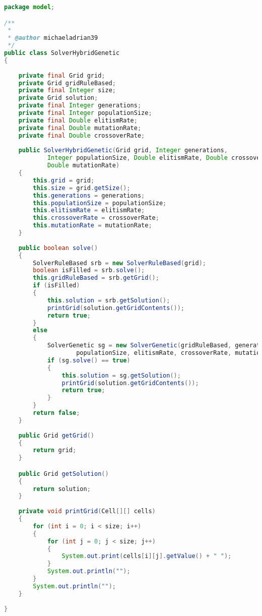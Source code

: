 \begin{lstlisting}[language=Java,basicstyle=\tiny,caption=SolverHybridGenetic.java]
package model;

/**
 *
 * @author michaeladrian39
 */
public class SolverHybridGenetic
{
    
    private final Grid grid;
    private Grid gridRuleBased;
    private final Integer size;
    private Grid solution;
    private final Integer generations;
    private final Integer populationSize;
    private final Double elitismRate;
    private final Double mutationRate;
    private final Double crossoverRate;
    
    public SolverHybridGenetic(Grid grid, Integer generations, 
            Integer populationSize, Double elitismRate, Double crossoverRate, 
            Double mutationRate)
    {
        this.grid = grid;
        this.size = grid.getSize();
        this.generations = generations;
        this.populationSize = populationSize;
        this.elitismRate = elitismRate;
        this.crossoverRate = crossoverRate;
        this.mutationRate = mutationRate;
    }
    
    public boolean solve()
    {
        SolverRuleBased srb = new SolverRuleBased(grid);
        boolean isFilled = srb.solve();
        this.gridRuleBased = srb.getGrid();
        if (isFilled)
        {
            this.solution = srb.getSolution();
            printGrid(solution.getGridContents());
            return true;
        }
        else
        {
            SolverGenetic sg = new SolverGenetic(gridRuleBased, generations, 
                    populationSize, elitismRate, crossoverRate, mutationRate);
            if (sg.solve() == true)
            {
                this.solution = sg.getSolution();
                printGrid(solution.getGridContents());
                return true;
            }
        }
        return false;
    }
    
    public Grid getGrid()
    {
        return grid;
    }

    public Grid getSolution()
    {
        return solution;
    }
    
    private void printGrid(Cell[][] cells)
    {
        for (int i = 0; i < size; i++)
        {
            for (int j = 0; j < size; j++)
            {
                System.out.print(cells[i][j].getValue() + " ");
            }
            System.out.println("");
        }
        System.out.println("");
    }
    
}
\end{lstlisting}

